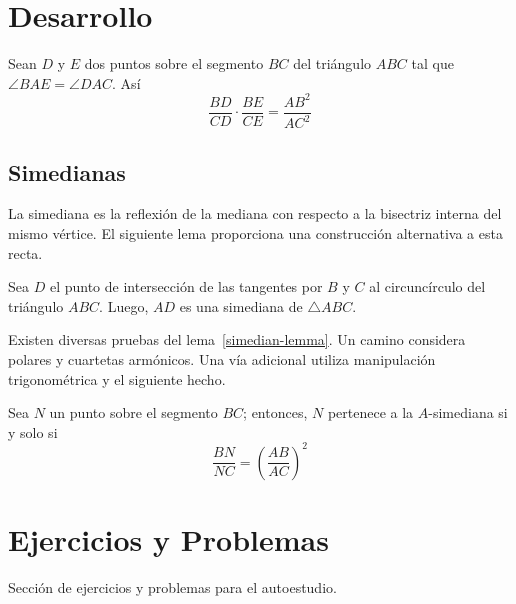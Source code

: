 \section{Desarrollo}

\begin{section-theorem.tcb}[Steiner]
    Sean $D$ y $E$ dos puntos sobre el segmento $BC$ del triángulo $ABC$ tal que $\angle BAE = \angle DAC$.
    Así
    \[\frac{BD}{CD} \cdot \frac{BE}{CE} = \frac{AB^2}{AC^2}\]
\end{section-theorem.tcb}


\subsection{Simedianas}

La simediana es la reflexión de la mediana con respecto a la bisectriz interna del mismo vértice.
El siguiente lema proporciona una construcción alternativa a esta recta.

\begin{section-lemma.tcb}\label{simedian-lemma}
    Sea $D$ el punto de intersección de las tangentes por $B$ y $C$ al circuncírculo del triángulo $ABC$.
    Luego, $AD$ es una simediana de $\triangle ABC$.
\end{section-lemma.tcb}

Existen diversas pruebas del lema~\ref{simedian-lemma}.
Un camino considera polares y cuartetas armónicos.
Una vía adicional utiliza manipulación trigonométrica y el siguiente hecho.

\begin{section-lemma.tcb}
    Sea $N$ un punto sobre el segmento $BC$; entonces, $N$ pertenece a la $A$\nobreakdash-simediana si y solo si
    \[\frac{BN}{NC} = \left(\frac{AB}{AC}\right)^2\]
\end{section-lemma.tcb}






\section{Ejercicios y Problemas}
Sección de ejercicios y problemas para el autoestudio.
